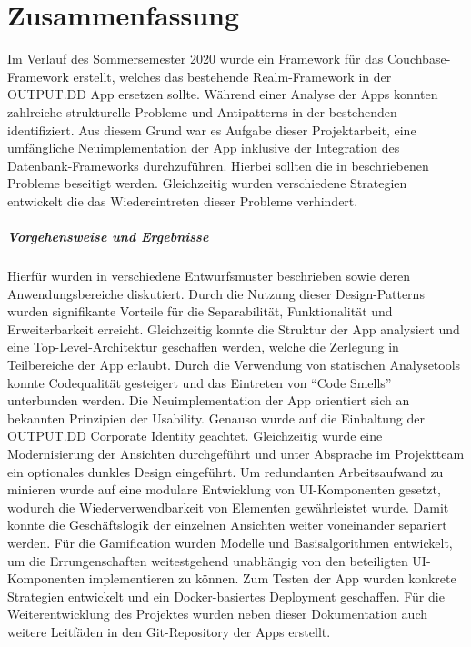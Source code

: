 \chapter{Zusammenfassung}\label{ch:zusammenfassung}

Im Verlauf des Sommersemester 2020 wurde ein Framework für das Couchbase-Framework erstellt, welches das bestehende Realm-Framework in der OUTPUT.DD App ersetzen sollte. Während einer Analyse der Apps konnten zahlreiche strukturelle Probleme und Antipatterns in der bestehenden identifiziert. Aus diesem Grund war es Aufgabe dieser Projektarbeit, eine umfängliche Neuimplementation der App inklusive der Integration des Datenbank-Frameworks durchzuführen. Hierbei sollten die in  beschriebenen Probleme beseitigt werden. Gleichzeitig wurden verschiedene Strategien entwickelt die das Wiedereintreten dieser Probleme verhindert. 

\paragraph{Vorgehensweise und Ergebnisse} Hierfür wurden in  verschiedene Entwurfsmuster beschrieben sowie deren Anwendungsbereiche diskutiert. Durch die Nutzung dieser Design-Patterns wurden signifikante Vorteile für die Separabilität, Funktionalität und Erweiterbarkeit erreicht. Gleichzeitig konnte die Struktur der App analysiert und eine Top-Level-Architektur geschaffen werden, welche die Zerlegung in Teilbereiche der App erlaubt. Durch die Verwendung von statischen Analysetools konnte Codequalität gesteigert und das Eintreten von \enquote{Code Smells} unterbunden werden. Die Neuimplementation der App orientiert sich an bekannten Prinzipien der Usability. Genauso wurde auf die Einhaltung der OUTPUT.DD Corporate Identity geachtet. Gleichzeitig wurde eine Modernisierung der Ansichten durchgeführt und unter Absprache im Projektteam ein optionales dunkles Design eingeführt. Um redundanten Arbeitsaufwand zu minieren wurde auf eine modulare Entwicklung von UI-Komponenten gesetzt, wodurch die Wiederverwendbarkeit von Elementen gewährleistet wurde. Damit konnte die Geschäftslogik der einzelnen Ansichten weiter voneinander separiert werden. Für die Gamification wurden Modelle und Basisalgorithmen entwickelt, um die Errungenschaften weitestgehend unabhängig von den beteiligten UI-Komponenten implementieren zu können. Zum Testen der App wurden konkrete Strategien entwickelt und ein Docker-basiertes Deployment geschaffen. Für die Weiterentwicklung des Projektes wurden neben dieser Dokumentation auch weitere Leitfäden in den Git-Repository der Apps erstellt.

